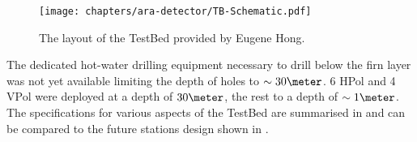 \begin{figure}[htpb]
  \centering
  \texttt{[image: chapters/ara-detector/TB-Schematic.pdf]}
  \caption{The layout of the TestBed provided by Eugene Hong.}
  \label{fig:ara-detector:TestBed:Schematic}
\end{figure}

The dedicated hot-water drilling equipment necessary to drill below the firn layer was not yet available limiting the depth of holes to $\sim 30 \meter$. 6 HPol and 4 VPol were deployed at a depth of $30 \meter$, the rest to a depth of $\sim 1 \meter$. The specifications for various aspects of the TestBed are summarised in  and can be compared to the future stations design shown in .


